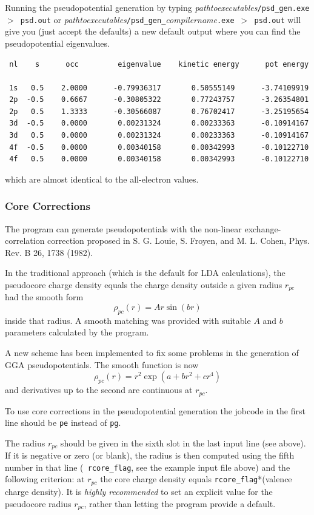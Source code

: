 \documentclass[11pt]{article}
\begin{document}
Running the pseudopotential generation by typing
\textit{pathtoexecutables}\texttt{/psd{\_}gen.exe $>$ psd.out} or
\textit{pathtoexecutables}\texttt{/psd\_gen\_}\textit{compilername}\texttt{.exe $>$ psd.out}
will give you (just accept the defaults) a new default output
where you can find the pseudopotential eigenvalues.

\begin{verbatim}
 nl    s      occ         eigenvalue    kinetic energy      pot energy

 1s   0.5    2.0000      -0.79936317       0.50555149      -3.74109919
 2p  -0.5    0.6667      -0.30805322       0.77243757      -3.26354801
 2p   0.5    1.3333      -0.30566087       0.76702417      -3.25195654
 3d  -0.5    0.0000       0.00231324       0.00233363      -0.10914167
 3d   0.5    0.0000       0.00231324       0.00233363      -0.10914167
 4f  -0.5    0.0000       0.00340158       0.00342993      -0.10122710
 4f   0.5    0.0000       0.00340158       0.00342993      -0.10122710
\end{verbatim}
which are almost identical to the all-electron values.


\subsubsection{Core Corrections}
\label{sec:cc}
The program can generate pseudopotentials with the non-linear
exchange-correlation correction proposed in S. G. Louie, S. Froyen,
and M. L. Cohen, Phys. Rev. B 26, 1738 (1982).

In the traditional approach (which is the default for LDA
calculations), the pseudocore charge density equals the charge density
outside a given radius $r_{pc}$ had the smooth form
$$
\rho_{pc}(r) = A r   \sin(b r)
$$
inside that radius. A smooth matching was provided with suitable $A$
and $b$ parameters calculated by the program.

A new scheme has been implemented to fix some problems in the generation
of GGA pseudopotentials. The smooth function is now
$$
\rho_{pc}(r) =  r^2  \exp{(a + b r^2 +c r^4)}
$$
and derivatives up to the second are continuous  at $r_{pc}$.

To use core corrections in the pseudopotential generation
the jobcode in the first line should be {\tt pe} instead of {\tt pg}.

The radius $r_{pc}$ should be  given in the sixth slot in the last
input line (see above). If it is negative or zero (or blank), the
radius is then computed using the fifth number in that line ({\tt
rcore\_flag}, see the example input file above)
and the following criterion: at $r_{pc}$ the core charge density
equals {\tt rcore\_flag}*(valence charge density).
It is {\it highly recommended} to set an explicit value for the pseudocore
radius $r_{pc}$, rather than letting the program provide a default.
\end{document}

